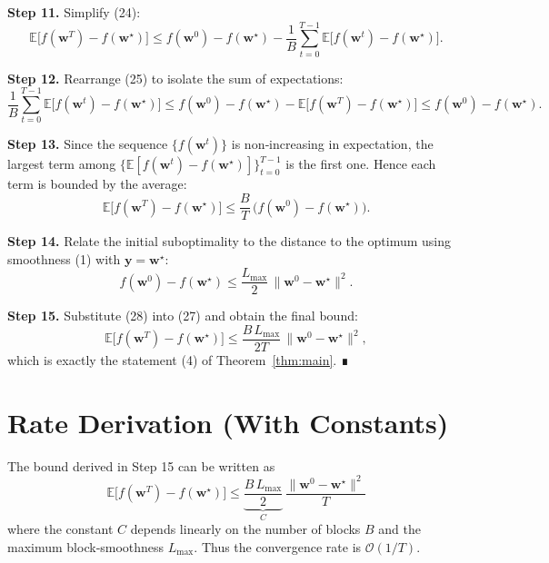 \documentclass{article}
\newcommand{\E}{\mathbb{E}}
\begin{document}
\noindent\textbf{Step 11.}  Simplify (24):
\[
\E\!\big[f(\bm w^{T})-f(\bm w^{\star})\big]
\le f(\bm w^{0})-f(\bm w^{\star})
-\frac{1}{B}\sum_{t=0}^{T-1}
\E\!\big[f(\bm w^{t})-f(\bm w^{\star})\big].
\tag{25}
\]

\noindent\textbf{Step 12.}  Rearrange (25) to isolate the sum of expectations:
\[
\frac{1}{B}\sum_{t=0}^{T-1}
\E\!\big[f(\bm w^{t})-f(\bm w^{\star})\big]
\le f(\bm w^{0})-f(\bm w^{\star})
-\E\!\big[f(\bm w^{T})-f(\bm w^{\star})\big]
\le f(\bm w^{0})-f(\bm w^{\star}).
\tag{26}
\]

\noindent\textbf{Step 13.}  Since the sequence $\{f(\bm w^{t})\}$ is non‑increasing in
expectation, the largest term among $\{ \E[f(\bm w^{t})-f(\bm w^{\star})]\}_{t=0}^{T-1}$
is the first one.  Hence each term is bounded by the average:
\[
\E\!\big[f(\bm w^{T})-f(\bm w^{\star})\big]
\le \frac{B}{T}\,
\big(f(\bm w^{0})-f(\bm w^{\star})\big).
\tag{27}
\]

\noindent\textbf{Step 14.}  Relate the initial suboptimality to the distance
to the optimum using smoothness (1) with $\bm y=\bm w^{\star}$:
\[
f(\bm w^{0})-f(\bm w^{\star})
\le \frac{L_{\max}}{2}\,\|\bm w^{0}-\bm w^{\star}\|^{2}.
\tag{28}
\]

\noindent\textbf{Step 15.}  Substitute (28) into (27) and obtain the final bound:
\[
\E\!\big[f(\bm w^{T})-f(\bm w^{\star})\big]
\le \frac{B\,L_{\max}}{2T}\,
\|\bm w^{0}-\bm w^{\star}\|^{2},
\]
which is exactly the statement (4) of Theorem~\ref{thm:main}. ∎

\vspace{0.5em}
\section*{Rate Derivation (With Constants)}
The bound derived in Step 15 can be written as
\[
\boxed{
\E\!\big[f(\bm w^{T})-f(\bm w^{\star})\big]
\le
\underbrace{\frac{B\,L_{\max}}{2}}_{C}\,
\frac{\|\bm w^{0}-\bm w^{\star}\|^{2}}{T}
}
\]
where the constant $C$ depends linearly on the number of blocks $B$ and the
maximum block‑smoothness $L_{\max}$.  Thus the convergence rate is
$\mathcal{O}(1/T)$.

\vspace{0.5em}
\end{document}
